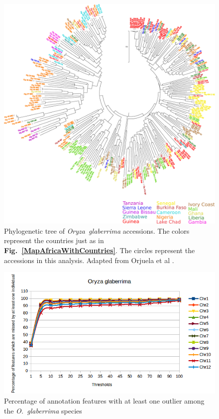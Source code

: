 \documentclass[10pt,letterpaper]{article}
\begin{document}
\begin{figure}
\centering
 \includegraphics[scale=0.3]{GlaberrimaWithCountries.pdf}
 \caption{Phylogenetic tree of \emph{Oryza~glaberrima} accessions. The colors represent the countries just as in \textbf{Fig.~\ref{MapAfricaWithCountries}}. The circles represent the accessions in this analysis.
 Adapted from Orjuela et al \cite{Orjuela2014}.}
 \label{MapGlab}
\end{figure}

\begin{figure}
\centering
 \includegraphics[scale=0.7]{determinationSeuilsJusqua100MSU7R_Og.png}
 \caption{Percentage of annotation features with at least one outlier among the \emph{O.~glaberrima} species}
 \label{SeuilsOG}
\end{figure}
\end{document}
